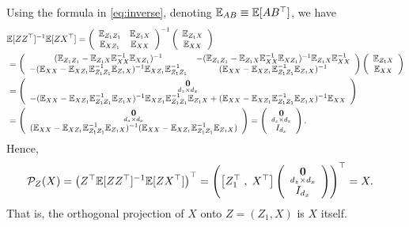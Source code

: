 \documentclass[11pt, A4paper, openany, uplatex]{book}
\begin{document}
Using the formula in \eqref{eq:inverse}, denoting $\mathbb{E}_{AB} \equiv \mathbb{E}[A B^\top] $, we have
\small\begin{align}\label{eq:ZX}
\begin{split}
\E[ZZ^\tr]^{-1}\E[ZX^\tr] 
	& = \left(\begin{array}{cc}
		\E_{Z_1 Z_1} & \E_{Z_1 X} \\
		\E_{X Z_1} & \E_{X X} 
		\end{array}	\right)^{-1}
	\left( \begin{array}{c}
		\E_{Z_1 X} \\
		\E_{X X} 
	\end{array}	\right) \\
	& \hspace{-80pt}= \left(\begin{array}{cc}
		(\E_{Z_1 Z_1}  - \E_{Z_1 X} \E_{X X} ^{-1}\E_{X Z_1} )^{-1} & -(\E_{Z_1 Z_1}  - \E_{Z_1 X} \E_{X X}^{-1} \E_{X Z_1} )^{-1} \E_{Z_1 X} \E_{X X}^{-1} \\
		-(\E_{X X}  - \E_{X Z_1} \E_{Z_1 Z_1}^{-1} \E_{Z_1 X} )^{-1} \E_{X Z_1} \E_{Z_1 Z_1}^{-1}  & (\E_{X X} - \E_{X Z_1} \E_{Z_1 Z_1}^{-1} \E_{Z_1 X} )^{-1}
	\end{array} \right)
	\left( \begin{array}{c}
		\E_{Z_1 X} \\
		\E_{X X} 
	\end{array}	\right)\\
	& \hspace{-80pt}= 
	\left(\begin{array}{c}
	\underset{d_z \times d_x}{\mathbf{0}} \\
	-(\E_{X X}  - \E_{X Z_1} \E_{Z_1 Z_1}^{-1} \E_{Z_1 X} )^{-1} \E_{X Z_1} \E_{Z_1 Z_1}^{-1} \E_{Z_1 X} + (\E_{X X} - \E_{X Z_1} \E_{Z_1 Z_1}^{-1} \E_{Z_1 X} )^{-1} \E_{XX}
	\end{array} \right) \\
	& \hspace{-80pt}= 
	\left(\begin{array}{c}
	\underset{d_z \times d_x}{\mathbf{0}} \\
	(\E_{X X}  - \E_{X Z_1} \E_{Z_1 Z_1}^{-1} \E_{Z_1 X} )^{-1} (\E_{X X} - \E_{X Z_1} \E_{Z_1 Z_1}^{-1} \E_{Z_1 X} )
	\end{array} \right)
	= 
	\left(\begin{array}{c}
	\underset{d_z \times d_x}{\mathbf{0}} \\
	I_{d_x}
	\end{array} \right).
\end{split}
\end{align}\normalsize
Hence,
\begin{align*}
	\mathcal{P}_Z(X)
	& = \left( Z^\top \mathbb{E}[ZZ^\top]^{-1} \mathbb{E}[ZX^\top] \right)^\top  = \left( \left[ Z^\top_1 \; , \; X^\top \right] \left(\begin{array}{c}
	\underset{d_z \times d_x}{\mathbf{0}} \\
	I_{d_x}
	\end{array} \right) \right)^\top = X.
\end{align*}
That is, the orthogonal projection of $X$ onto $Z = (Z_1, X)$ is $X$ itself.
\end{document}
